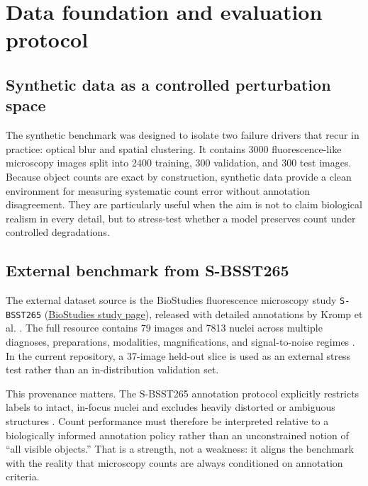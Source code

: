\documentclass[10pt,a4paper,twocolumn]{article}
\begin{document}
\section{Data foundation and evaluation protocol}

\subsection{Synthetic data as a controlled perturbation space}
The synthetic benchmark was designed to isolate two failure drivers that recur in practice: optical blur and spatial clustering. It contains 3000 fluorescence-like microscopy images split into 2400 training, 300 validation, and 300 test images. Because object counts are exact by construction, synthetic data provide a clean environment for measuring systematic count error without annotation disagreement. They are particularly useful when the aim is not to claim biological realism in every detail, but to stress-test whether a model preserves count under controlled degradations.

\subsection{External benchmark from S-BSST265}
The external dataset source is the BioStudies fluorescence microscopy study \texttt{S-BSST265} (\href{https://www.ebi.ac.uk/biostudies/bioimages/studies/S-BSST265}{BioStudies study page}), released with detailed annotations by Kromp et al. \cite{kromp_dataset,kromp_biostudies}. The full resource contains 79 images and 7813 nuclei across multiple diagnoses, preparations, modalities, magnifications, and signal-to-noise regimes \cite{kromp_dataset}. In the current repository, a 37-image held-out slice is used as an external stress test rather than an in-distribution validation set.

This provenance matters. The S-BSST265 annotation protocol explicitly restricts labels to intact, in-focus nuclei and excludes heavily distorted or ambiguous structures \cite{kromp_dataset}. Count performance must therefore be interpreted relative to a biologically informed annotation policy rather than an unconstrained notion of ``all visible objects.'' That is a strength, not a weakness: it aligns the benchmark with the reality that microscopy counts are always conditioned on annotation criteria.
\end{document}
